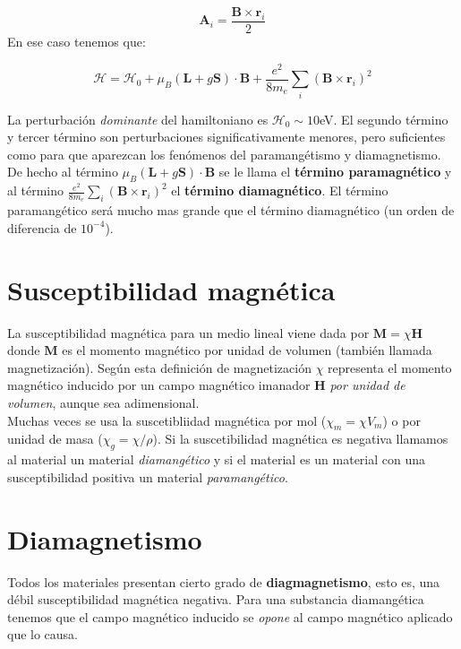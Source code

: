 \documentclass[12pt,a4paper]{book}
\numberwithin{equation}{section}
\numberwithin{figure}{section}
\newcommand{\Hcal}{\mathcal{H}}
\newcommand{\rn}{\mathbf{r}}
\newcommand{\An}{\mathbf{A}}
\newcommand{\Bn}{\mathbf{B}}
\newcommand{\Hn}{\mathbf{H}}
\newcommand{\Ln}{\mathbf{L}}
\newcommand{\Mn}{\mathbf{M}}
\newcommand{\Sn}{\mathbf{S}}
\begin{document}
\begin{equation}
\An_i = \frac{\Bn \times \rn_i}{2}
\end{equation}
En ese caso tenemos que:

\begin{equation}
\Hcal = \Hcal_0 + \mu_B (\Ln  + g \Sn) \cdot \Bn + \frac{e^2}{8 m_e} \sum_i (\Bn \times \rn_i)^2
\end{equation}

La perturbación \textit{dominante} del hamiltoniano es $\Hcal_0 \sim 10$eV. El segundo término y tercer término son perturbaciones significativamente menores, pero suficientes como para que aparezcan los fenómenos del paramangétismo y diamagnetismo. De hecho al término $\mu_B (\Ln  + g \Sn) \cdot \Bn $ se le llama el \textbf{término paramagnético} y al término $\frac{e^2}{8 m_e} \sum_i (\Bn \times \rn_i)^2$ el \textbf{término diamagnético}. El término paramangético será mucho mas grande que el término diamagnético (un orden de diferencia de $10^{-4}$).

\section{Susceptibilidad magnética}

La susceptibilidad magnética para un medio lineal viene dada por $\Mn = \chi \Hn$ donde $\Mn$ es el momento magnético por unidad de volumen (también llamada magnetización). Según esta definición de magnetización $\chi$ representa el momento magnético inducido por un campo magnético imanador $\Hn$ \textit{por unidad de volumen}, aunque sea adimensional.   \\

Muchas veces se usa la suscetibliidad magnética por mol ($\chi_m = \chi V_m$) o  por unidad de masa ($\chi_g = \chi / \rho$). Si la suscetibilidad magnética es negativa llamamos al material un material \textit{diamangético} y si el material es un material con una susceptibilidad positiva un material \textit{paramangético}.

\section{Diamagnetismo}

Todos los materiales presentan cierto grado de \textbf{diagmagnetismo}, esto es, una débil susceptibilidad magnética negativa. Para una substancia diamangética tenemos que el campo magnético inducido se \textit{opone} al campo magnético aplicado que lo causa. \\
\end{document}
